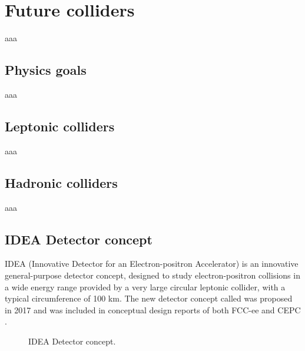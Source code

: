 \chapter{Future colliders}
aaa

\section{Physics goals}
aaa

\section{Leptonic colliders}
aaa

\section{Hadronic colliders}
aaa

\section{IDEA Detector concept} \label{sec:Idea_project}
IDEA (Innovative Detector for an Electron-positron Accelerator) is an innovative general-purpose detector concept, designed to study electron-positron collisions in a wide energy range provided by a very large circular leptonic collider, with a typical circumference of 100 km.
The new detector concept called was proposed in 2017 and was included in conceptual design reports of both FCC-ee \cite{FCC-ee_design} and CEPC \cite{CEPC_design}.

\begin{figure}
	\centering
	 \quad
	\caption{IDEA Detector concept.}
\end{figure}

